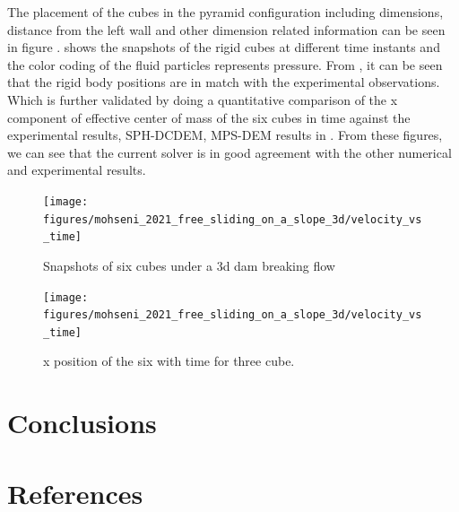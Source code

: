 \documentclass[preprint,12pt]{elsarticle}
\begin{document}
The placement of the cubes in the pyramid configuration including dimensions,
distance from the left wall and other dimension related information can be
seen in figure .
 shows the snapshots of
the rigid cubes at different time instants and the color coding of the fluid
particles represents pressure. From
, it can be seen that the
rigid body positions are in match with the experimental observations. Which is
further validated by doing a quantitative comparison of the x component of
effective center of mass of the six cubes in time against the experimental
results, SPH-DCDEM, MPS-DEM results in
. From these figures, we
can see that the current solver is in good agreement with the other numerical
and experimental results.
\begin{figure}[!htpb]
  \centering
  \texttt{[image: figures/mohseni\_2021\_free\_sliding\_on\_a\_slope\_3d/velocity\_vs\_time]}
  \caption{Snapshots of six cubes under a 3d dam breaking flow}
\label{fig:snapshots-six-cubes-3d-dam-breaking-flow}
\end{figure}
\begin{figure}[!htpb]
  \centering
  \texttt{[image: figures/mohseni\_2021\_free\_sliding\_on\_a\_slope\_3d/velocity\_vs\_time]}
  \caption{x position of the six with time for three cube.}
\label{fig:x-position-six-cube-3d-dam-breaking-flow}
\end{figure}







\section{Conclusions}
\label{sec:conclusions}

\section*{References}


\end{document}
